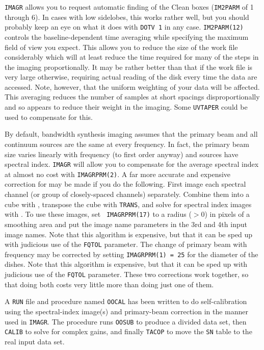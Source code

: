 {\tt IMAGR} allows you to request automatic finding of the Clean boxes
({\tt IM2PARM} of 1 through 6).  In cases with low sidelobes, this
works rather well, but you should probably keep an eye on what it does
with {\tt DOTV 1} in any case.  {\tt IM2PARM(12)} controls the
baseline-dependent time averaging while specifying the maximum field
of view you expect.  This allows you to reduce the size of the work
file considerably which will at least reduce the time required for
many of the steps in the imaging proportionally.  It may be rather
better than that if the work file is very large otherwise, requiring
actual reading of the disk every time the data are accessed.  Note,
however, that the uniform weighting of your data will be affected.
This averaging reduces the number of samples at short spacings
disproportionally and so appears to reduce their weight in the
imaging.  Some {\tt UVTAPER} could be used to compensate for this.

By default, bandwidth synthesis imaging assumes that the primary beam
and all continuum sources are the same at every frequency.  In fact,
the primary beam size varies linearly with frequency (to first order
anyway) and sources have spectral index.  {\tt IMAGR} will allow you
to compensate for the average spectral index at almost no cost with
{\tt IMAGRPRM(2)}\@.  A far more accurate and expensive correction for
 may be made if you do the following.  First
image each spectral channel (or group of closely-spaced channels)
separately.  Combine them into a cube with {\tt {}},
transpose the cube with {\tt TRANS}, and solve for spectral index
images with {\tt {}}\@.  To use these images, set {\tt
IMAGRPRM(17)} to a radius ($> 0$) in pixels of a smoothing area and
put the image name parameters in the 3rd and 4th input image names.
Note that this algorithm is expensive, but that it can be sped up with
judicious use of the {\tt FQTOL} parameter.  The change of primary
beam with frequency may be corrected by setting {\tt IMAGRPRM(1) = 25}
for the diameter of the  dishes.  Note that this algorithm
is expensive, but that it can be sped up with judicious use of the
{\tt FQTOL} parameter.  These two corrections work together, so that
doing both costs very little more than doing just one of them.

A {\tt RUN} file and procedure named {\tt OOCAL} has been written to
do self-calibration using the spectral-index image(s) and primary-beam
correction in the manner used in {\tt IMAGR}\@.  The procedure runs
{\tt OOSUB} to produce a divided data set, then {\tt CALIB} to solve
for complex gains, and finally {\tt TACOP} to move the {\tt SN} table
to the real input data set.

